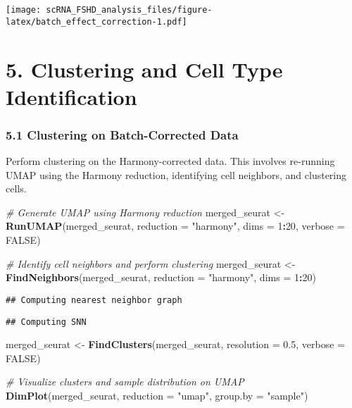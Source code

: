 \documentclass[
]{article}
\newenvironment{Shaded}{\begin{snugshade}}{\end{snugshade}}
\newcommand{\AttributeTok}[1]{\textcolor[rgb]{0.13,0.29,0.53}{#1}}
\newcommand{\CommentTok}[1]{\textcolor[rgb]{0.56,0.35,0.01}{\textit{#1}}}
\newcommand{\ConstantTok}[1]{\textcolor[rgb]{0.56,0.35,0.01}{#1}}
\newcommand{\DecValTok}[1]{\textcolor[rgb]{0.00,0.00,0.81}{#1}}
\newcommand{\FloatTok}[1]{\textcolor[rgb]{0.00,0.00,0.81}{#1}}
\newcommand{\FunctionTok}[1]{\textcolor[rgb]{0.13,0.29,0.53}{\textbf{#1}}}
\newcommand{\NormalTok}[1]{#1}
\newcommand{\OtherTok}[1]{\textcolor[rgb]{0.56,0.35,0.01}{#1}}
\newcommand{\SpecialCharTok}[1]{\textcolor[rgb]{0.81,0.36,0.00}{\textbf{#1}}}
\newcommand{\StringTok}[1]{\textcolor[rgb]{0.31,0.60,0.02}{#1}}
\begin{document}
\texttt{[image: scRNA\_FSHD\_analysis\_files/figure-latex/batch\_effect\_correction-1.pdf]}

\section{5. Clustering and Cell Type
Identification}\label{clustering-and-cell-type-identification}

\subsubsection{5.1 Clustering on Batch-Corrected
Data}\label{clustering-on-batch-corrected-data}

Perform clustering on the Harmony-corrected data. This involves
re-running UMAP using the Harmony reduction, identifying cell neighbors,
and clustering cells.

\begin{Shaded}
\begin{Highlighting}[]
\CommentTok{\# Generate UMAP using Harmony reduction}
\NormalTok{merged\_seurat }\OtherTok{\textless{}{-}} \FunctionTok{RunUMAP}\NormalTok{(merged\_seurat, }\AttributeTok{reduction =} \StringTok{"harmony"}\NormalTok{, }\AttributeTok{dims =} \DecValTok{1}\SpecialCharTok{:}\DecValTok{20}\NormalTok{, }\AttributeTok{verbose =} \ConstantTok{FALSE}\NormalTok{)}

\CommentTok{\# Identify cell neighbors and perform clustering}
\NormalTok{merged\_seurat }\OtherTok{\textless{}{-}} \FunctionTok{FindNeighbors}\NormalTok{(merged\_seurat, }\AttributeTok{reduction =} \StringTok{"harmony"}\NormalTok{, }\AttributeTok{dims =} \DecValTok{1}\SpecialCharTok{:}\DecValTok{20}\NormalTok{)}
\end{Highlighting}
\end{Shaded}

\begin{verbatim}
## Computing nearest neighbor graph
\end{verbatim}

\begin{verbatim}
## Computing SNN
\end{verbatim}

\begin{Shaded}
\begin{Highlighting}[]
\NormalTok{merged\_seurat }\OtherTok{\textless{}{-}} \FunctionTok{FindClusters}\NormalTok{(merged\_seurat, }\AttributeTok{resolution =} \FloatTok{0.5}\NormalTok{, }\AttributeTok{verbose =} \ConstantTok{FALSE}\NormalTok{)}

\CommentTok{\# Visualize clusters and sample distribution on UMAP}
\FunctionTok{DimPlot}\NormalTok{(merged\_seurat, }\AttributeTok{reduction =} \StringTok{"umap"}\NormalTok{, }\AttributeTok{group.by =} \StringTok{"sample"}\NormalTok{)}
\end{Highlighting}
\end{Shaded}
\end{document}
